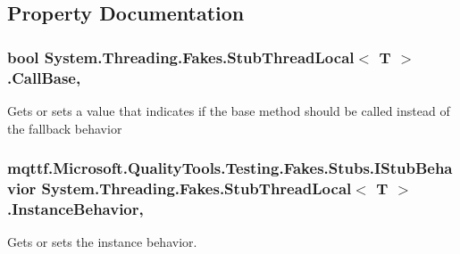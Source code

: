 \subsection{Property Documentation}
\hypertarget{class_system_1_1_threading_1_1_fakes_1_1_stub_thread_local_3_01_t_01_4_ab0d25c943fa377593b7e346e67d48cc9}{
\subsubsection[{Call\-Base}]{\setlength{\rightskip}{0pt plus 5cm}bool System.\-Threading.\-Fakes.\-Stub\-Thread\-Local$<$ T $>$.Call\-Base\hspace{0.3cm}{\ttfamily [get]}, {\ttfamily [set]}}}\label{class_system_1_1_threading_1_1_fakes_1_1_stub_thread_local_3_01_t_01_4_ab0d25c943fa377593b7e346e67d48cc9}


Gets or sets a value that indicates if the base method should be called instead of the fallback behavior

\hypertarget{class_system_1_1_threading_1_1_fakes_1_1_stub_thread_local_3_01_t_01_4_a8745233d5bfe9cde76de98e4a7ebd5a4}{
\subsubsection[{Instance\-Behavior}]{\setlength{\rightskip}{0pt plus 5cm}mqttf.\-Microsoft.\-Quality\-Tools.\-Testing.\-Fakes.\-Stubs.\-I\-Stub\-Behavior System.\-Threading.\-Fakes.\-Stub\-Thread\-Local$<$ T $>$.Instance\-Behavior\hspace{0.3cm}{\ttfamily [get]}, {\ttfamily [set]}}}\label{class_system_1_1_threading_1_1_fakes_1_1_stub_thread_local_3_01_t_01_4_a8745233d5bfe9cde76de98e4a7ebd5a4}


Gets or sets the instance behavior.

